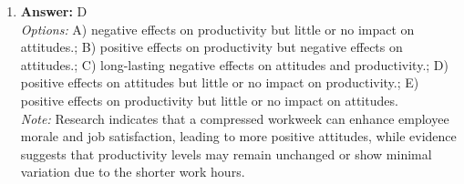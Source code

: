 \documentclass[12pt]{article}
\begin{document}
\begin{enumerate}[label=\arabic*.]
\\ \textit{Note:} Attribution theorists identify the tendency to overattribute behavior to personal traits while underestimating situational influences as a key error in causal attributions, highlighting the importance of context in understanding others' actions.
\item \textbf{Answer:} D
\\ \textit{Options:} A) negative effects on productivity but little or no impact on attitudes.; B) positive effects on productivity but negative effects on attitudes.; C) long-lasting negative effects on attitudes and productivity.; D) positive effects on attitudes but little or no impact on productivity.; E) positive effects on productivity but little or no impact on attitudes.
\\ \textit{Note:} Research indicates that a compressed workweek can enhance employee morale and job satisfaction, leading to more positive attitudes, while evidence suggests that productivity levels may remain unchanged or show minimal variation due to the shorter work hours.
\end{enumerate}
\end{document}
